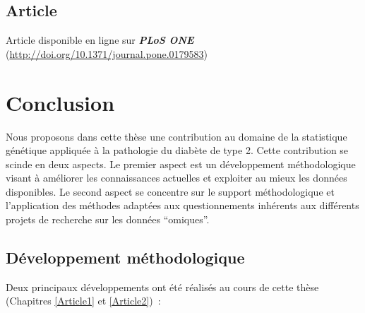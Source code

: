 \documentclass[11pt,a4paper,notrimn]{krantz}
\theoremstyle{definition}
\theoremstyle{definition}
\theoremstyle{remark}
\begin{document}
\section{Article}\label{article-3}

Article disponible en ligne sur \textbf{\emph{PLoS ONE}}
(\url{http://doi.org/10.1371/journal.pone.0179583}) \clearpage

\chapter*{Conclusion}\label{conclusion-4}


\setcounter{section}{0}

Nous proposons dans cette thèse une contribution au domaine de la
statistique génétique appliquée à la pathologie du diabète de type 2.
Cette contribution se scinde en deux aspects. Le premier aspect est un
développement méthodologique visant à améliorer les connaissances
actuelles et exploiter au mieux les données disponibles. Le second
aspect se concentre sur le support méthodologique et l'application des
méthodes adaptées aux questionnements inhérents aux différents projets
de recherche sur les données ``omiques''.

\section{Développement
méthodologique}\label{developpement-methodologique}

Deux principaux développements ont été réalisés au cours de cette thèse
(Chapitres \ref{Article1} et \ref{Article2})~:
\end{document}
